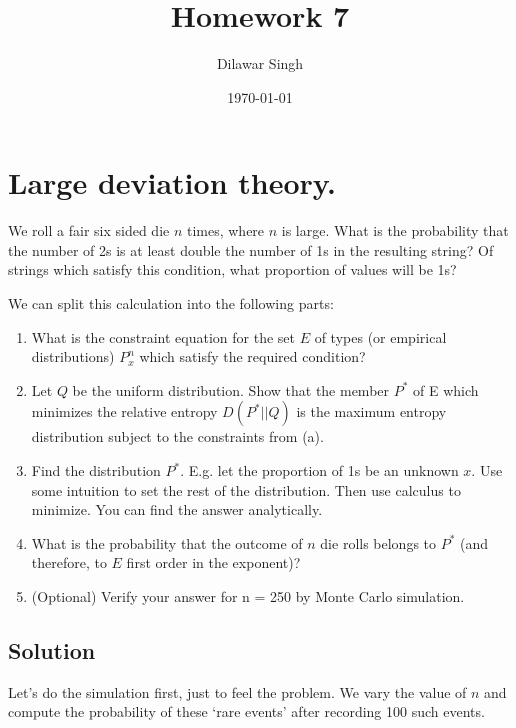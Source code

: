 \documentclass[]{article}
\title{Homework 7}
\author{Dilawar Singh}
\date{\today}
\begin{document}
\maketitle

\section{Large deviation theory.}\label{large-deviation-theory.}

We roll a fair six sided die \(n\) times, where \(n\) is large. What is
the probability that the number of 2s is at least double the number of
1s in the resulting string? Of strings which satisfy this condition,
what proportion of values will be 1s?

We can split this calculation into the following parts:

\begin{enumerate}
\def\labelenumi{\alph{enumi}.}
\item
  What is the constraint equation for the set \(E\) of types (or
  empirical distributions) \(P_x^n\) which satisfy the required
  condition?
\item
  Let \(Q\) be the uniform distribution. Show that the member \(P^*\) of
  E which minimizes the relative entropy \(D(P^*||Q)\) is the maximum
  entropy distribution subject to the constraints from (a).
\item
  Find the distribution \(P^*\). E.g. let the proportion of 1s be an
  unknown \(x\). Use some intuition to set the rest of the distribution.
  Then use calculus to minimize. You can find the answer analytically.
\item
  What is the probability that the outcome of \(n\) die rolls belongs to
  \(P^*\) (and therefore, to \(E\) first order in the exponent)?
\item
  (Optional) Verify your answer for n = 250 by Monte Carlo simulation.
\end{enumerate}

\subsection{Solution}\label{solution}

Let's do the simulation first, just to feel the problem. We vary the
value of \(n\) and compute the probability of these `rare events' after
recording 100 such events.
\end{document}
